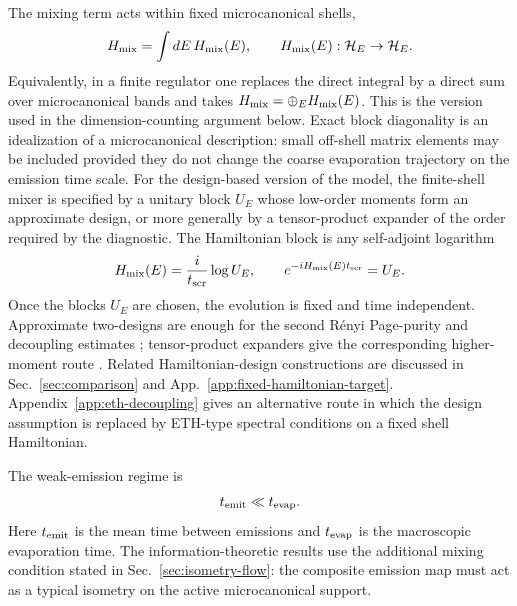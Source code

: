 \documentclass[12pt]{article}
\begin{document}
The mixing term acts within fixed microcanonical shells,
\begin{equation}
    H_{\rm mix}=\int dE\,H_{\rm mix}(E),
    \qquad
    H_{\rm mix}(E):\mathcal H_E\to\mathcal H_E.
\end{equation}
Equivalently, in a finite regulator one replaces the direct integral by a
direct sum over microcanonical bands and takes
$H_{\rm mix}=\oplus_E H_{\rm mix}(E)$.  This is the version used in the
dimension-counting argument below.  Exact block diagonality is an idealization
of a microcanonical description: small off-shell matrix elements may be
included provided they do not change the coarse evaporation trajectory on the
emission time scale.
For the design-based version of the model, the finite-shell mixer is
specified by a unitary block $U_E$ whose low-order moments form an approximate
design, or more generally by a tensor-product expander of the order required by
the diagnostic.  The Hamiltonian block is any self-adjoint logarithm
\begin{equation}
    H_{\rm mix}(E)=\frac{i}{t_{\rm scr}}\log U_E,
    \qquad
    e^{-iH_{\rm mix}(E)t_{\rm scr}}=U_E .
\end{equation}
Once the blocks $U_E$ are chosen, the evolution is fixed and time independent.
Approximate two-designs are enough for the second R\'enyi Page-purity and
decoupling estimates
\cite{DankertCleveEmersonLivine2009,SzehrDupuisTomamichelRenner2013};
tensor-product expanders give the corresponding higher-moment route
\cite{HarrowLow2009}.  Related Hamiltonian-design constructions are discussed
in Sec.~\ref{sec:comparison} and App.~\ref{app:fixed-hamiltonian-target}.
Appendix~\ref{app:eth-decoupling} gives an alternative route in which the
design assumption is replaced by ETH-type spectral conditions on a fixed
shell Hamiltonian.

The weak-emission regime is
\begin{equation}
    t_{\rm emit}\ll t_{\rm evap}.
\end{equation}
Here $t_{\rm emit}$ is the mean time between emissions and $t_{\rm evap}$ is
the macroscopic evaporation time.  The information-theoretic results use the
additional mixing condition stated in Sec.~\ref{sec:isometry-flow}: the
composite emission map must act as a typical isometry on the active
microcanonical support.
\end{document}

